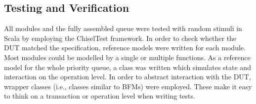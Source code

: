 \documentclass[conference]{IEEEtran}
\begin{document}

\subsection{Testing and Verification}

All modules and the fully assembled queue were tested with random stimuli in Scala by employing the ChiselTest framework.
In order to check whether the DUT matched the specification, reference models were written for each module. Most modules 
could be modelled by a single or multiple functions. As a reference model for the whole priority queue, a class 
was written which simulates state and interaction on the operation level. In order to abstract interaction with the DUT,
wrapper classes (i.e., classes similar to BFMs) were employed. These make it easy to think on a transaction or 
operation level when writing tests.
\end{document}
